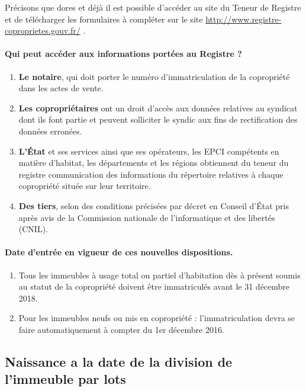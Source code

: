 				Précisons que dores et déjà il est possible d’accéder au site du Teneur de Registre et de télécharger les formulaires à compléter sur le site \url{http://www.registre-coproprietes.gouv.fr/} .
			
			\paragraph{Qui peut accéder aux informations portées au Registre ?}
			
				\begin{enumerate}
					\item \textbf{Le notaire}, qui doit porter le numéro d'immatriculation de la copropriété dans les actes de vente.
					\item \textbf{Les copropriétaires} ont un droit d'accès aux données relatives au syndicat dont ils font partie et peuvent solliciter le syndic aux fins de rectification des données erronées.
					\item \textbf{L'État} et ses services ainsi que ses opérateurs, les EPCI compétents en matière d'habitat, les départements et les régions obtiennent du teneur du registre communication des informations du répertoire relatives à chaque copropriété située sur leur territoire.
					\item \textbf{Des tiers}, selon des conditions précisées par décret en Conseil d'État pris après avis de la Commission nationale de l'informatique et des libertés (CNIL).
				\end{enumerate}
			
			\paragraph{Date d’entrée en vigueur de ces nouvelles dispositions.}
				\begin{enumerate}[label=\alph*)]
					\item Tous les immeubles à usage total ou partiel d’habitation dès à présent soumis au statut de la copropriété doivent être immatriculés avant le 31 décembre 2018.
					\item Pour les immeubles neufs ou mis en copropriété : l’immatriculation devra se faire automatiquement à compter du 1er décembre 2016.
				\end{enumerate}
		
	\subsection{Naissance a la date de la division de l’immeuble par lots}
	
